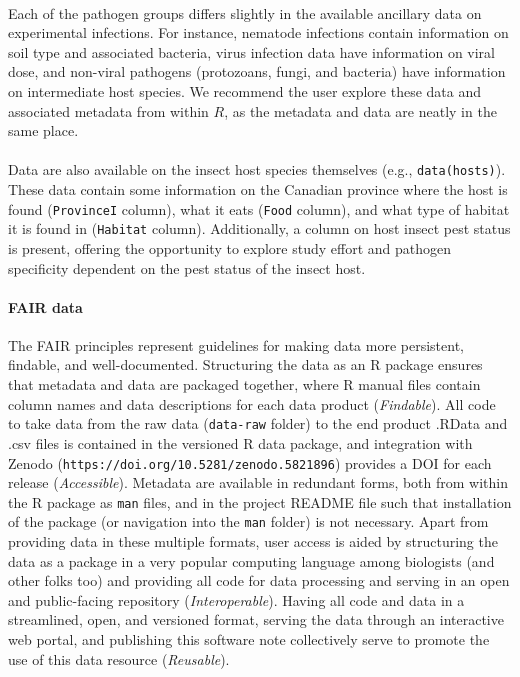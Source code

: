 \documentclass[12pt]{article}
\begin{document}
\paragraph*{}
Each of the pathogen groups differs slightly in the available ancillary data on experimental infections. For instance, nematode infections contain information on soil type and associated bacteria, virus infection data have information on viral dose, and non-viral pathogens (protozoans, fungi, and bacteria) have information on intermediate host species. We recommend the user explore these data and associated metadata from within $R$, as the metadata and data are neatly in the same place. 



\paragraph*{}
Data are also available on the insect host species themselves (e.g., \texttt{data(hosts)}). These data contain some information on the Canadian province where the host is found (\texttt{ProvinceI} column), what it eats (\texttt{Food} column), and what type of habitat it is found in (\texttt{Habitat} column). Additionally, a column on host insect pest status is present, offering the opportunity to explore study effort and pathogen specificity dependent on the pest status of the insect host. 




\paragraph*{FAIR data}
The FAIR principles represent guidelines for making data more persistent, findable, and well-documented. Structuring the data as an R package ensures that metadata and data are packaged together, where R manual files contain column names and data descriptions for each data product (\textit{Findable}). All code to take data from the raw data (\texttt{data-raw} folder) to the end product .RData and .csv files is contained in the versioned R data package, and integration with Zenodo (\texttt{https://doi.org/10.5281/zenodo.5821896}) provides a DOI for each release (\textit{Accessible}). Metadata are available in redundant forms, both from within the R package as \texttt{man} files, and in the project README file such that installation of the package (or navigation into the \texttt{man} folder) is not necessary. Apart from providing data in these multiple formats, user access is aided by structuring the data as a package in a very popular computing language among biologists (and other folks too) and providing all code for data processing and serving in an open and public-facing repository (\textit{Interoperable}). Having all code and data in a streamlined, open, and versioned format, serving the data through an interactive web portal, and publishing this software note collectively serve to promote the use of this data resource (\textit{Reusable}).
\end{document}
